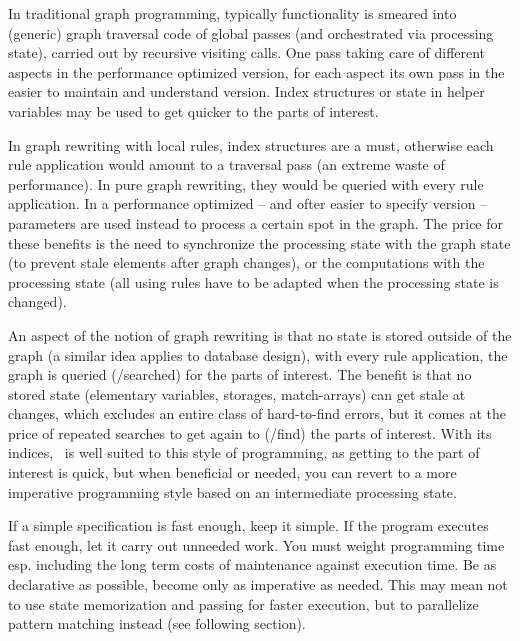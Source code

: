 In traditional graph programming, 
typically functionality is smeared into (generic) graph traversal code of global passes (and orchestrated via processing state), carried out by recursive visiting calls.
One pass taking care of different aspects in the performance optimized version,
for each aspect its own pass in the easier to maintain and understand version.
Index structures or state in helper variables may be used to get quicker to the parts of interest.

In graph rewriting with local rules, index structures are a must, otherwise each rule application would amount to a traversal pass (an extreme waste of performance).
In pure graph rewriting, they would be queried with every rule application.
In a performance optimized -- and ofter easier to specify version -- parameters are used instead to process a certain spot in the graph.
The price for these benefits is the need to synchronize the processing state with the graph state (to prevent stale elements after graph changes), or the computations with the processing state (all using rules have to be adapted when the processing state is changed).

\begin{note}
An aspect of the notion of graph rewriting is that no state is stored outside of the graph (a similar idea applies to database design), 
with every rule application, the graph is queried (/searched) for the parts of interest.
The benefit is that no stored state (elementary variables, storages, match-arrays) can get stale at changes,
which excludes an entire class of hard-to-find errors,
but it comes at the price of repeated searches to get again to (/find) the parts of interest.
With its indices, \GrG~is well suited to this style of programming, as getting to the part of interest is quick, but when beneficial or needed, you can revert to a more imperative programming style based on an intermediate processing state.
\end{note}

\begin{note}
If a simple specification is fast enough, keep it simple.
If the program executes fast enough, let it carry out unneeded work.
You must weight programming time esp. including the long term costs of maintenance against execution time.
Be as declarative as possible, become only as imperative as needed.
This may mean not to use state memorization and passing for faster execution, but to parallelize pattern matching instead (see following section).
\end{note}


